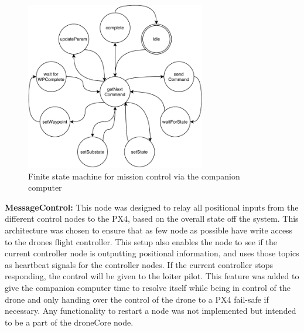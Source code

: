 \documentclass[../Head/Main.tex]{subfiles}
\begin{document}
\begin{figure}[H]
    \centering
    \includegraphics[width=0.7\textwidth]{../Figures/simulation/missionControlFSM.pdf}
    \caption{Finite state machine for mission control via the companion computer}
    \label{fig:FSM_MSSN}
\end{figure}
\par 

\clearpage 
\textbf{MessageControl:}
This node was designed to relay all positional inputs from the different control nodes to the PX4, based on the overall state off the system. This architecture was chosen to ensure that as few node as possible have write access to the drones flight controller. This setup also enables the node to see if the current controller node is outputting positional information, and uses those topics as heartbeat signals for the controller nodes. If the current controller stops responding, the control will be given to the loiter pilot. This feature was added to give the companion computer time to resolve itself while being in control of the drone and only handing over the control of the drone to a PX4 fail-safe if necessary. Any functionality to restart a node was not implemented but intended to be a part of the droneCore node.   
\par 
\end{document}
